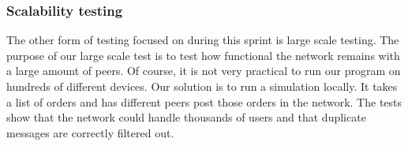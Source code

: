 \subsubsection{Scalability testing}
\label{sprint3:scalability}
The other form of testing focused on during this sprint is large scale testing.
The purpose of our large scale test is to test how functional the network remains with a large amount of peers.
Of course, it is not very practical to run our program on hundreds of different devices.
Our solution is to run a simulation locally.
It takes a list of orders and has different peers post those orders in the network.
The tests show that the network could handle thousands of users and that duplicate messages are correctly filtered out.